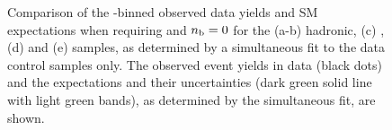 \begin{figure}[t!]
\begin{center}
{    } 
    \caption{\label{fig:best-fit-control-only-ge4j0b} Comparison of the
      \scalht-binned observed data yields and SM expectations when
      requiring \njethigh and $n_{\text{b}} = 0$ for the (a-b) hadronic, (c)
      \mj, (d) \mmj and (e) \gj samples, as determined by a
      simultaneous fit to the data control samples only. The observed
      event yields in data (black dots) and the expectations and their
      uncertainties (dark green solid line with light green bands), as
      determined by the simultaneous fit, are shown. }
  \end{center}
\end{figure}

